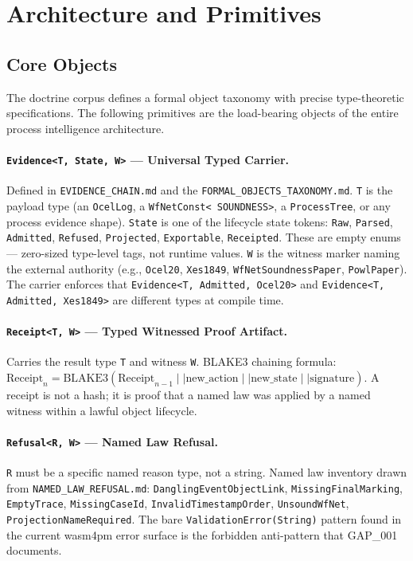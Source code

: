 \section{Architecture and Primitives}
\label{sec:doctrine-architecture}

\subsection{Core Objects}
\label{sec:doctrine-architecture-objects}

The doctrine corpus defines a formal object taxonomy with precise type-theoretic
specifications. The following primitives are the load-bearing objects of the entire
process intelligence architecture.

\paragraph{\texttt{Evidence\textless{}T, State, W\textgreater{}} --- Universal Typed Carrier.}
Defined in \texttt{EVIDENCE\_CHAIN.md} and the \texttt{FORMAL\_OBJECTS\_TAXONOMY.md}.
\texttt{T} is the payload type (an \texttt{OcelLog}, a \texttt{WfNetConst\textless
SOUNDNESS\textgreater{}}, a \texttt{ProcessTree}, or any process evidence shape). \texttt{State}
is one of the lifecycle state tokens: \texttt{Raw}, \texttt{Parsed}, \texttt{Admitted},
\texttt{Refused}, \texttt{Projected}, \texttt{Exportable}, \texttt{Receipted}. These are
empty enums --- zero-sized type-level tags, not runtime values. \texttt{W} is the witness
marker naming the external authority (e.g., \texttt{Ocel20}, \texttt{Xes1849},
\texttt{WfNetSoundnessPaper}, \texttt{PowlPaper}). The carrier enforces that
\texttt{Evidence\textless{}T, Admitted, Ocel20\textgreater{}} and
\texttt{Evidence\textless{}T, Admitted, Xes1849\textgreater{}} are different types at compile
time.

\paragraph{\texttt{Receipt\textless{}T, W\textgreater{}} --- Typed Witnessed Proof Artifact.}
Carries the result type \texttt{T} and witness \texttt{W}. BLAKE3 chaining formula:
$\text{Receipt}_n = \text{BLAKE3}(\text{Receipt}_{n-1} \mid\mid \text{new\_action} \mid\mid
\text{new\_state} \mid\mid \text{signature})$. A receipt is not a hash; it is proof that a
named law was applied by a named witness within a lawful object lifecycle.

\paragraph{\texttt{Refusal\textless{}R, W\textgreater{}} --- Named Law Refusal.}
\texttt{R} must be a specific named reason type, not a string. Named law inventory drawn
from \texttt{NAMED\_LAW\_REFUSAL.md}: \texttt{DanglingEventObjectLink},
\texttt{MissingFinalMarking}, \texttt{EmptyTrace}, \texttt{MissingCaseId},
\texttt{InvalidTimestampOrder}, \texttt{UnsoundWfNet}, \texttt{ProjectionNameRequired}.
The bare \texttt{ValidationError(String)} pattern found in the current wasm4pm error surface
is the forbidden anti-pattern that GAP\_001 documents.

